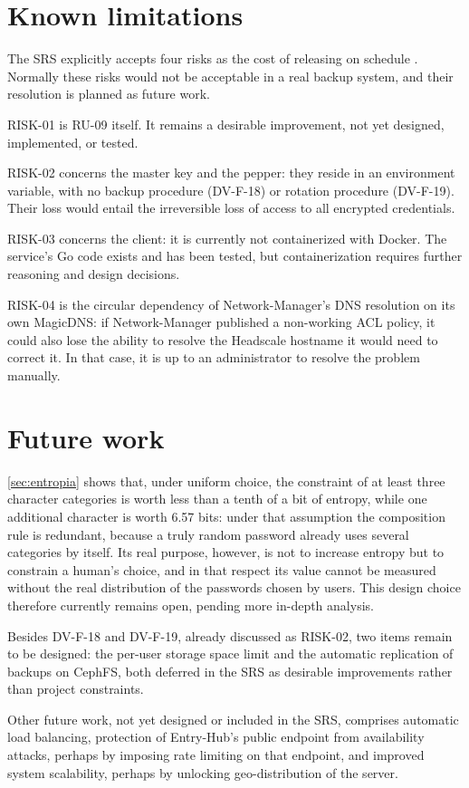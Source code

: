 \section{Known limitations}

The SRS explicitly accepts four risks as the cost of releasing on schedule \cite{ramusb-srs}.
Normally these risks would not be acceptable in a real backup system, and their resolution is
planned as future work.

RISK-01 is RU-09 itself. It remains a desirable improvement, not yet designed, implemented, or tested.

RISK-02 concerns the master key and the pepper: they reside in an environment variable, with no backup procedure
(DV-F-18) or rotation procedure (DV-F-19). Their loss
would entail the irreversible loss of access to all encrypted credentials.

RISK-03 concerns the client: it is currently not containerized with Docker. The service's Go code exists and has
been tested, but containerization requires further reasoning and design decisions.

RISK-04 is the circular dependency of Network-Manager's DNS resolution on its own MagicDNS: if
Network-Manager published a non-working ACL policy, it could also lose the ability to
resolve the Headscale hostname it would need to correct it. In that case, it is up to an
administrator to resolve the problem manually.

\section{Future work}

\autoref{sec:entropia} shows that, under uniform choice, the constraint of at least three character
categories is worth less than a tenth of a bit of entropy, while one additional character is worth 6.57 bits: under
that assumption the composition rule is redundant, because a truly random password
already uses several categories by itself. Its real purpose, however, is not to increase entropy but to constrain a human's
choice, and in that respect its value cannot be measured without the real distribution of the passwords chosen
by users.
This design choice therefore currently remains open, pending more in-depth analysis.

Besides DV-F-18 and DV-F-19, already discussed as RISK-02, two items remain to be designed: the per-user
storage space limit and the automatic replication of backups on CephFS, both
deferred in the SRS as desirable improvements rather than project constraints.

Other future work, not yet designed or included in the SRS, comprises automatic load
balancing, protection of Entry-Hub's public endpoint from availability attacks,
perhaps by imposing rate limiting on that endpoint, and improved system scalability, perhaps
by unlocking geo-distribution of the server.
